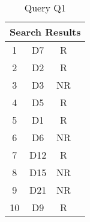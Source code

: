 \begin{table}[h]
	\centering
	\caption{Query Q1}
	\begin{tabular}{|c|c|c|c|}
		\hline
		\multicolumn{4}{|c|}{\textbf{Search Results}} \\
		\hline
		1  & D7  & R  &                               \\
		2  & D2  & R  &                               \\
		3  & D3  & NR &                               \\
		4  & D5  & R  &                               \\
		5  & D1  & R  &                               \\
		6  & D6  & NR &                               \\
		7  & D12 & R  &                               \\
		8  & D15 & NR &                               \\
		9  & D21 & NR &                               \\
		10 & D9  & R  &                               \\
		\hline
		\hline
	\end{tabular}
\end{table}

